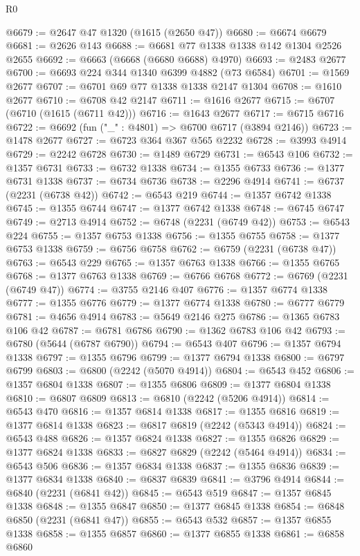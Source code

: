 \begin{lexlean}{R0}
\begin{coremodule}
@6679 := @2647 @47 @1320 (@1615 (@2650 @47))
@6680 := @6674 @6679
@6681 := @2626 @143
@6688 := @6681 @77 @1338 @1338 @142 @1304 @2526 @2655
@6692 := @6663 (@6668 (@6680 @6688) @4970)
@6693 := @2483 @2677
@6700 := @6693 @224 @344 @1340 @6399 @4882 (@73 @6584)
@6701 := @1569 @2677
@6707 := @6701 @69 @77 @1338 @1338 @2147 @1304
@6708 := @1610 @2677
@6710 := @6708 @42 @2147
@6711 := @1616 @2677
@6715 := @6707 (@6710 (@1615 (@6711 @42)))
@6716 := @1643 @2677
@6717 := @6715 @6716
@6722 := @6692 (fun ("_" : @4801) => @6700 @6717 (@3894 @2146))
@6723 := @1478 @2677
@6727 := @6723 @364 @367 @565 @2232
@6728 := @3993 @4914
@6729 := @2242 @6728
@6730 := @1489 @6729
@6731 := @6543 @106
@6732 := @1357 @6731
@6733 := @6732 @1338
@6734 := @1355 @6733
@6736 := @1377 @6731 @1338
@6737 := @6734 @6736
@6738 := @2296 @4914
@6741 := @6737 (@2231 (@6738 @42))
@6742 := @6543 @219
@6744 := @1357 @6742 @1338
@6745 := @1355 @6744
@6747 := @1377 @6742 @1338
@6748 := @6745 @6747
@6749 := @2713 @4914
@6752 := @6748 (@2231 (@6749 @42))
@6753 := @6543 @224
@6755 := @1357 @6753 @1338
@6756 := @1355 @6755
@6758 := @1377 @6753 @1338
@6759 := @6756 @6758
@6762 := @6759 (@2231 (@6738 @47))
@6763 := @6543 @229
@6765 := @1357 @6763 @1338
@6766 := @1355 @6765
@6768 := @1377 @6763 @1338
@6769 := @6766 @6768
@6772 := @6769 (@2231 (@6749 @47))
@6774 := @3755 @2146 @407
@6776 := @1357 @6774 @1338
@6777 := @1355 @6776
@6779 := @1377 @6774 @1338
@6780 := @6777 @6779
@6781 := @4656 @4914
@6783 := @5649 @2146 @275
@6786 := @1365 @6783 @106 @42
@6787 := @6781 @6786
@6790 := @1362 @6783 @106 @42
@6793 := @6780 (@5644 (@6787 @6790))
@6794 := @6543 @407
@6796 := @1357 @6794 @1338
@6797 := @1355 @6796
@6799 := @1377 @6794 @1338
@6800 := @6797 @6799
@6803 := @6800 (@2242 (@5070 @4914))
@6804 := @6543 @452
@6806 := @1357 @6804 @1338
@6807 := @1355 @6806
@6809 := @1377 @6804 @1338
@6810 := @6807 @6809
@6813 := @6810 (@2242 (@5206 @4914))
@6814 := @6543 @470
@6816 := @1357 @6814 @1338
@6817 := @1355 @6816
@6819 := @1377 @6814 @1338
@6823 := @6817 @6819 (@2242 (@5343 @4914))
@6824 := @6543 @488
@6826 := @1357 @6824 @1338
@6827 := @1355 @6826
@6829 := @1377 @6824 @1338
@6833 := @6827 @6829 (@2242 (@5464 @4914))
@6834 := @6543 @506
@6836 := @1357 @6834 @1338
@6837 := @1355 @6836
@6839 := @1377 @6834 @1338
@6840 := @6837 @6839
@6841 := @3796 @4914
@6844 := @6840 (@2231 (@6841 @42))
@6845 := @6543 @519
@6847 := @1357 @6845 @1338
@6848 := @1355 @6847
@6850 := @1377 @6845 @1338
@6854 := @6848 @6850 (@2231 (@6841 @47))
@6855 := @6543 @532
@6857 := @1357 @6855 @1338
@6858 := @1355 @6857
@6860 := @1377 @6855 @1338
@6861 := @6858 @6860

\end{coremodule}
\end{lexlean}
